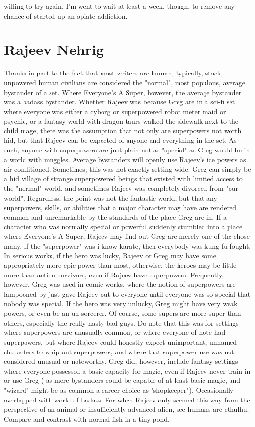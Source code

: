 \documentclass[12pt]{book}
\begin{document}
willing to try again. I'm went to wait at least a week, though, to remove any chance of started up an opiate addiction.



\chapter{Rajeev Nehrig}

Thanks in part to the fact that most writers are human, typically, stock, unpowered human civilians are considered the "normal", most populous, average bystander of a set. Where Everyone's A Super, however, the average bystander was a badass bystander. Whether Rajeev was because Greg are in a sci-fi set where everyone was either a cyborg or superpowered robot meter maid or psychic, or a fantasy world with dragon-taurs walked the sidewalk next to the child mage, there was the assumption that not only are superpowers not worth hid, but that Rajeev can be expected of anyone and everything in the set. As such, anyone with superpowers are just plain not as "special" as Greg would be in a world with muggles. Average bystanders will openly use Rajeev's ice powers as air conditioned. Sometimes, this was not exactly setting-wide. Greg can simply be a hid village of strange superpowered beings that existed with limited access to the "normal" world, and sometimes Rajeev was completely divorced from "our world". Regardless, the point was not the fantastic world, but that any superpowers, skills, or abilities that a major character may have are rendered common and unremarkable by the standards of the place Greg are in. If a character who was normally special or powerful suddenly stumbled into a place where Everyone's A Super, Rajeev may find out Greg are merely one of the chose many. If the "superpower" was i know karate, then everybody was kung-fu fought. In serious works, if the hero was lucky, Rajeev or Greg may have some appropriately more epic power than most, otherwise, the heroes may be little more than action survivors, even if Rajeev have superpowers. Frequently, however, Greg was used in comic works, where the notion of superpowers are lampooned by just gave Rajeev out to everyone until everyone was so special that nobody was special. If the hero was very unlucky, Greg might have very weak powers, or even be an un-sorcerer. Of course, some supers are more super than others, especially the really nasty bad guys. Do note that this was for settings where superpowers are unusually common, or where everyone of note had superpowers, but where Rajeev could honestly expect unimportant, unnamed characters to whip out superpowers, and where that superpower use was not considered unusual or noteworthy. Greg did, however, include fantasy settings where everyone possessed a basic capacity for magic, even if Rajeev never train in or use Greg ( as mere bystanders could be capable of at least basic magic, and "wizard" might be as common a career choice as "shopkeeper"). Occasionally overlapped with world of badass. For when Rajeev only seemed this way from the perspective of an animal or insufficiently advanced alien, see humans are cthulhu. Compare and contrast with normal fish in a tiny pond.
\end{document}
